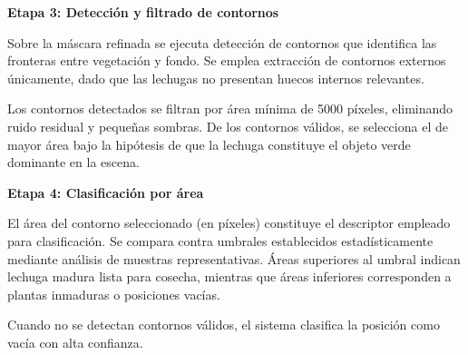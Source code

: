 \textbf{Etapa 3: Detección y filtrado de contornos}

Sobre la máscara refinada se ejecuta detección de contornos que identifica las fronteras entre vegetación y fondo. Se emplea extracción de contornos externos únicamente, dado que las lechugas no presentan huecos internos relevantes.

Los contornos detectados se filtran por área mínima de 5000 píxeles, eliminando ruido residual y pequeñas sombras. De los contornos válidos, se selecciona el de mayor área bajo la hipótesis de que la lechuga constituye el objeto verde dominante en la escena.

\textbf{Etapa 4: Clasificación por área}

El área del contorno seleccionado (en píxeles) constituye el descriptor empleado para clasificación. Se compara contra umbrales establecidos estadísticamente mediante análisis de muestras representativas. Áreas superiores al umbral indican lechuga madura lista para cosecha, mientras que áreas inferiores corresponden a plantas inmaduras o posiciones vacías.

Cuando no se detectan contornos válidos, el sistema clasifica la posición como vacía con alta confianza.



